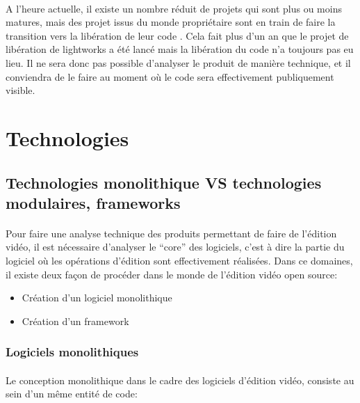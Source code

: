 \paragraph{}
A l'heure actuelle, il existe un nombre réduit de projets qui
sont plus ou moins matures, mais des projet issus du monde propriétaire
sont en train de faire la transition vers la libération de leur code
\cite{TheLightworksOpenSourceProjectStartHere}. Cela fait plus d'un an que
le projet de libération de lightworks a été lancé mais la libération
du code n'a toujours pas eu lieu. Il ne sera donc pas possible d'analyser
le produit de manière technique, et il conviendra de le faire au moment
où le code sera effectivement publiquement visible.

\newpage
\section{Technologies} 

\subsection {Technologies monolithique VS technologies modulaires, frameworks}
\paragraph{}
Pour faire une analyse technique
des produits permettant de faire de l'édition vidéo, il est nécessaire
d'analyser le ``core'' des logiciels, c'est à dire la partie du
logiciel où les opérations d'édition sont effectivement réalisées. Dans
ce domaines, il existe deux façon de procéder dans le monde de l'édition
vidéo open source:

\begin{itemize} \setlength{\itemsep}{2mm}
  \item{Création d'un logiciel monolithique}
  \item{Création d'un framework }
\end{itemize}

\subsubsection{Logiciels monolithiques} %

\paragraph{}
Le conception monolithique dans le cadre des logiciels d'édition vidéo,
consiste au sein d'un même entité de code:

